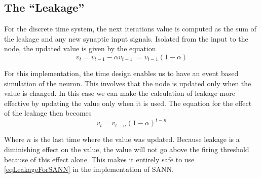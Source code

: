
	
	


	\subsection{The ``Leakage''}
	\label{secTheLeakageForSANN}
	For the discrete time system, the next iterations value is computed as the sum of the leakage and any new synaptic input signals.
	Isolated from the input to the node, the updated value is given by the equation
	\begin{equation}
		v_t = v_{t-1} - \alpha v_{t-1} \; = v_{t-1} (1-\alpha)
	\end{equation}

	For this implementation, the time design enables us to have an event based simulation of the neuron.
	This involves that the node is updated only when the value is changed.
	In this case we can make the calculation of leakage more effective by updating the value only when it is used.
	The equation for the effect of the leakage then becomes
	\begin{equation}
		v_t = v_{t-n} (1-\alpha)^{t-n}
		\label{eqLeakageForSANN}
	\end{equation}
	
	Where $n$ is the last time where the value was updated. 
	Because leakage is a diminishing effect on the value, the value will not go above the firing threshold because of this effect alone.
	This makes it entirely safe to use \eqref{eqLeakageForSANN} in the implementation of SANN.

